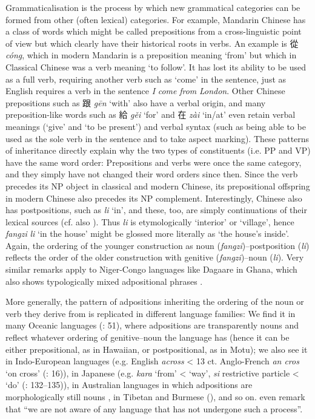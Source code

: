 \documentclass[output=paper]{langsci/langscibook}
\begin{document}
Grammaticalisation is the process by which new grammatical categories can be formed from other (often lexical) categories. For example, Mandarin Chinese has a class of words which might be called prepositions from a cross-linguistic point of view but which clearly have their historical roots in verbs. An example is 從 \textit{cóng}, which in modern Mandarin is a preposition meaning ‘from’ but which in Classical Chinese was a verb meaning ‘to follow’. It has lost its ability to be used as a full verb, requiring another verb such as ‘come’ in the sentence, just as English requires a verb in the sentence \textit{I} \textit{come} \textit{from} \textit{London}. Other Chinese prepositions such as 跟 \textit{gēn} ‘with’ also have a verbal origin, and many preposition-like words such as 給 \textit{gěi} ‘for’ and 在 \textit{zài} ‘in/at’ even retain verbal meanings (‘give’ and ‘to be present’) and verbal syntax (such as being able to be used as the sole verb in the sentence and to take aspect marking). These patterns of inheritance directly explain why the two types of constituents (i.e. PP and VP) have the same word order: Prepositions and verbs were once the same category, and they simply have not changed their word orders since then. Since the verb precedes its NP object in classical and modern Chinese, its prepositional offspring in modern Chinese also precedes its NP complement. Interestingly, Chinese also has postpositions, such as \textit{li} ‘in’, and these, too, are simply continuations of their lexical sources (cf. also \citealt{Dryer2019tv}). Thus \textit{li} is etymologically ‘interior’ or ‘village’, hence \textit{fangzi} \textit{li} ‘in the house’ might be glossed more literally as ‘the house’s inside’. Again, the ordering of the younger construction as noun (\textit{fangzi})–postposition (\textit{li}) reflects the order of the older construction with genitive (\textit{fangzi})–noun (\textit{li}). Very similar remarks apply to Niger-Congo languages like Dagaare in Ghana, which also shows typologically mixed adpositional phrases \citep{Bodomo1997}. 

More generally, the pattern of adpositions inheriting the ordering of the noun or verb they derive from is replicated in different language families: We find it in many Oceanic languages (\citealt{LynchEtAl2002}: 51), where adpositions are transparently nouns and reflect whatever ordering of genitive–noun the language has (hence it can be either prepositional, as in Hawaiian, or postpositional, as in Motu); we also see it in Indo-European languages (e.g. English \textit{across} < 13 ct. Anglo-French \textit{an cros} ‘on cross’ (\citealt{BordetJamet2010}: 16)), in Japanese (e.g. \textit{kara} ‘from’ < ‘way’, \textit{si} restrictive particle < ‘do’ (\citealt{Frellesvig2010}: 132–135)), in Australian languages in which adpositions are morphologically still nouns \citep{Dixon2002}, in Tibetan and Burmese (\citealt{DeLancey1997}), and so on. \citet[62]{HeineKuteva2007} even remark that “we are not aware of any language that has not undergone such a process”.
\end{document}
